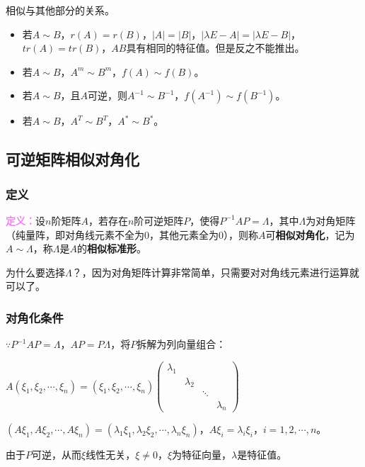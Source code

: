 \documentclass[UTF8, 12pt]{ctexart}
\begin{document}
相似与其他部分的关系。

\begin{itemize}
    \item 若$A\sim B$，$r(A)=r(B)$，$\vert A\vert=\vert B\vert$，$\vert\lambda E-A\vert=\vert\lambda E-B\vert$，$tr(A)=tr(B)$，$AB$具有相同的特征值。但是反之不能推出。
    \item 若$A\sim B$，$A^m\sim B^m$，$f(A)\sim f(B)$。
    \item 若$A\sim B$，且$A$可逆，则$A^{-1}\sim B^{-1}$，$f(A^{-1})\sim f(B^{-1})$。
    \item 若$A\sim B$，$A^T\sim B^T$，$A^*\sim B^*$。
\end{itemize}

\subsection{可逆矩阵相似对角化}

\subsubsection{定义}

\textcolor{violet}{\textbf{定义：}}设$n$阶矩阵$A$，若存在$n$阶可逆矩阵$P$，使得$P^{-1}AP=\Lambda$，其中$\Lambda$为对角矩阵（纯量阵，即对角线元素不全为0，其他元素全为0），则称$A$可\textbf{相似对角化}，记为$A\sim\Lambda$，称$\Lambda$是$A$的\textbf{相似标准形}。

为什么要选择$\Lambda$？，因为对角矩阵计算非常简单，只需要对对角线元素进行运算就可以了。

\subsubsection{对角化条件}

$\because P^{-1}AP=\Lambda$，$AP=P\Lambda$，将$P$拆解为列向量组合：

$A(\xi_1,\xi_2,\cdots,\xi_n)=(\xi_1,\xi_2,\cdots,\xi_n)\left(\begin{array}{cccc}
    \lambda_1 \\
     & \lambda_2 \\
     & & \ddots \\
     & & & \lambda_n
\end{array}\right)$

$(A\xi_1,A\xi_2,\cdots,A\xi_n)=(\lambda_1\xi_1,\lambda_2\xi_2,\cdots,\lambda_n\xi_n)$，$A\xi_i=\lambda_i\xi_i$，$i=1,2,\cdots,n$。

由于$P$可逆，从而$\xi$线性无关，$\xi\neq0$，$\xi$为特征向量，$\lambda$是特征值。
\end{document}

